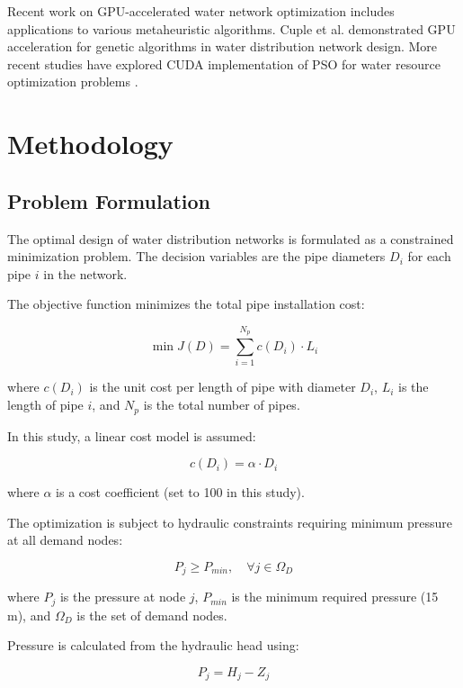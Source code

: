 \documentclass[conference]{IEEEtran}
\begin{document}
Recent work on GPU-accelerated water network optimization includes applications to various metaheuristic algorithms. Cuple et al. \cite{cuple2014gpu} demonstrated GPU acceleration for genetic algorithms in water distribution network design. More recent studies have explored CUDA implementation of PSO for water resource optimization problems \cite{el2016parallel}.

\section{Methodology}

\subsection{Problem Formulation}

The optimal design of water distribution networks is formulated as a constrained minimization problem. The decision variables are the pipe diameters $D_i$ for each pipe $i$ in the network.

The objective function minimizes the total pipe installation cost:

\begin{equation}
\min J(D) = \sum_{i=1}^{N_p} c(D_i) \cdot L_i
\end{equation}

where $c(D_i)$ is the unit cost per length of pipe with diameter $D_i$, $L_i$ is the length of pipe $i$, and $N_p$ is the total number of pipes.

In this study, a linear cost model is assumed:

\begin{equation}
c(D_i) = \alpha \cdot D_i
\end{equation}

where $\alpha$ is a cost coefficient (set to 100 in this study).

The optimization is subject to hydraulic constraints requiring minimum pressure at all demand nodes:

\begin{equation}
P_j \geq P_{min}, \quad \forall j \in \Omega_D
\end{equation}

where $P_j$ is the pressure at node $j$, $P_{min}$ is the minimum required pressure (15 m), and $\Omega_D$ is the set of demand nodes.

Pressure is calculated from the hydraulic head using:

\begin{equation}
P_j = H_j - Z_j
\end{equation}
\end{document}
